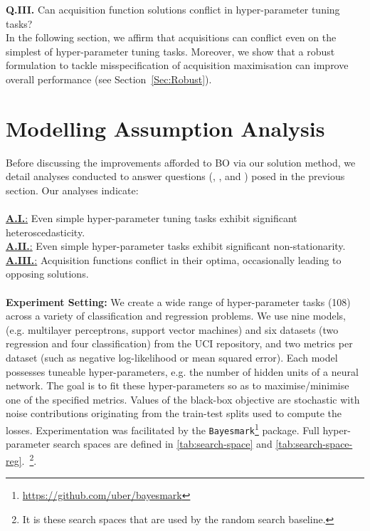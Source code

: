 \documentclass[jair,twoside,11pt,theapa]{article}
\theoremstyle{definition}
\begin{document}
\par{\textbf{Q.III.}} Can acquisition function solutions conflict in hyper-parameter tuning tasks? \\

\noindent In the following section, we affirm that acquisitions can conflict even on the simplest of hyper-parameter tuning tasks. Moreover, we show that a robust formulation to tackle misspecification of acquisition maximisation can improve overall performance (see Section~\ref{Sec:Robust}).
 


\section{Modelling Assumption Analysis}\label{Sec:Answers}
Before discussing the improvements afforded to BO via our solution method, we detail analyses conducted to answer questions (, , and ) posed in the previous section. Our analyses indicate: \\ \\
\underline{\textbf{A.I.}:} Even simple hyper-parameter tuning tasks exhibit significant heteroscedasticity.\\
\underline{\textbf{A.II.}:} Even simple  hyper-parameter tasks exhibit significant non-stationarity.\\
\underline{\textbf{A.III.}:} Acquisition functions conflict in their optima, occasionally leading to opposing solutions. \\ \\
\textbf{Experiment Setting:} We create a wide range of hyper-parameter tasks (108) across a variety of classification and regression problems. We use nine models, (e.g. multilayer perceptrons, support vector machines) and six datasets (two regression and four classification) from the UCI repository, and two metrics per dataset (such as negative log-likelihood or mean squared error). Each model possesses tuneable hyper-parameters, e.g. the number of hidden units of a neural network. The goal is to fit these hyper-parameters so as to maximise/minimise one of the specified metrics. Values of the black-box objective are stochastic with noise contributions originating from the train-test splits used to compute the losses. Experimentation was facilitated by the \texttt{Bayesmark}\footnote{\href{https://github.com/uber/bayesmark}{https://github.com/uber/bayesmark}} package. Full hyper-parameter search spaces are defined in \autoref{tab:search-space} and \autoref{tab:search-space-reg}.~\footnote{It is these search spaces that are used by the random search baseline.}. \\
\end{document}
